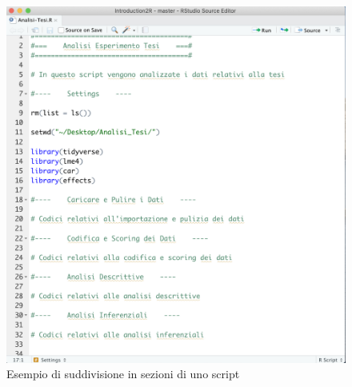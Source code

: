 \documentclass[
]{book}
\begin{document}
\begin{figure}

{\centering \includegraphics[width=0.85\linewidth]{images/script-template} 

}

\caption{Esempio di suddivisione in sezioni di uno script}\label{fig:script-template}
\end{figure}
\end{document}
